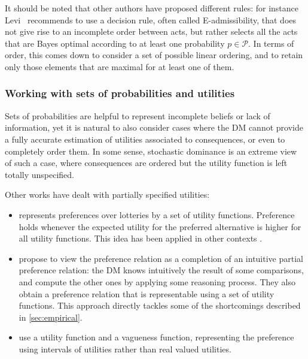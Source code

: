 \documentclass[french, english]{llncs}
\begin{document}
	It should be noted that other authors have proposed different rules: for instance Levi~\cite{levi_enterprise_1983} recommends to use a decision rule, often called E-admissibility, that does not give rise to an incomplete order between acts, but rather selects all the acts that are Bayes optimal according to at least one probability $p \in \mathcal{P}$. In terms of order, this comes down to consider a set of possible linear ordering, and to retain only those elements that are maximal for at least one of them. 
	
	
	\subsubsection{Working with sets of probabilities and utilities}
	
	Sets of probabilities are helpful to represent incomplete beliefs or lack of information, yet it is natural to also consider cases where the \ac{DM} cannot provide a fully accurate estimation of utilities associated to consequences, or even to completely order them. In some sense, stochastic dominance is an extreme view of such a case, where consequences are ordered but the utility function is left totally unspecified. 
	
	Other works have dealt with partially specified utilities:
	\begin{itemize}
		\item \citet{dubra_expected_2004} represents preferences over lotteries by a set of utility functions. Preference holds whenever the expected utility for the preferred alternative is higher for all utility functions. This idea has been applied in other contexts \citep{ok_utility_2002}.
		\item \citet{dubra_model_2002} propose to view the preference relation as a completion of an intuitive partial preference relation: the \ac{DM} knows intuitively the result of some comparisons, and compute the other ones by applying some reasoning process. They also obtain a preference relation that is representable using a set of utility functions. This approach directly tackles some of the shortcomings described in \cref{sec:empirical}.
		\item \citet{manzini_representation_2008} use a utility function and a vagueness function, representing the preference using intervals of utilities rather than real valued utilities. %
	\end{itemize}
\end{document}
